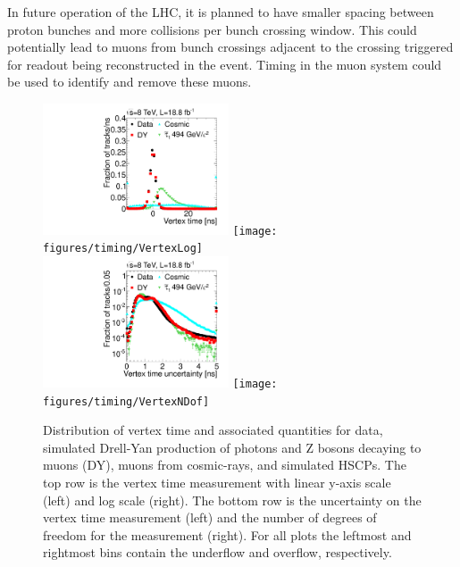 In future operation of the LHC, it is planned to have smaller spacing between proton bunches and more collisions per bunch crossing window.
This could potentially lead to muons from bunch crossings adjacent to the crossing triggered for readout being reconstructed in the event.
Timing in the muon system could be used to identify and remove these muons.

\begin{figure}
  \begin{center}
      \includegraphics[width=0.49\textwidth]{figures/timing/Vertex}
      \texttt{[image: figures/timing/VertexLog]} \\
      \includegraphics[width=0.49\textwidth]{figures/timing/VertexErr}
      \texttt{[image: figures/timing/VertexNDof]} \\
      \caption[Distribution of vertex time and associated quantities]
      {Distribution of vertex time and associated quantities for data,
simulated Drell-Yan production of photons and Z bosons decaying to muons (DY), muons from cosmic-rays, and simulated HSCPs.
The top row is the vertex time measurement with linear y-axis scale (left) and log scale (right).
The bottom row is the uncertainty on the vertex time measurement (left) and the number of degrees of freedom for the measurement (right).
For all plots the leftmost and rightmost bins contain the underflow and overflow, respectively.
        }
      \label{fig:vertextime}
  \end{center}
\end{figure}


